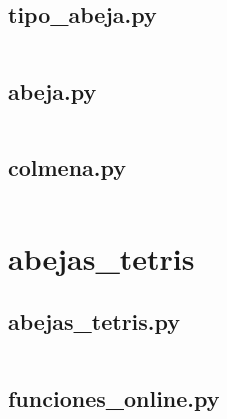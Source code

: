 \subsection{tipo\_abeja.py}
\inputminted[linenos]{python}{../codigo/abejas_tetris/abc/tipo_abeja.py}
\subsection{abeja.py}
\inputminted[linenos]{python}{../codigo/abejas_tetris/abc/abeja.py}
\subsection{colmena.py}
\inputminted[linenos]{python}{../codigo/abejas_tetris/abc/colmena.py}

\section{abejas\_tetris}

\subsection{abejas\_tetris.py}
\inputminted[linenos]{python}{../codigo/abejas_tetris/abejas_tetris.py}
\subsection{funciones\_online.py}
\inputminted[linenos]{python}{../codigo/abejas_tetris/funciones_online.py}
